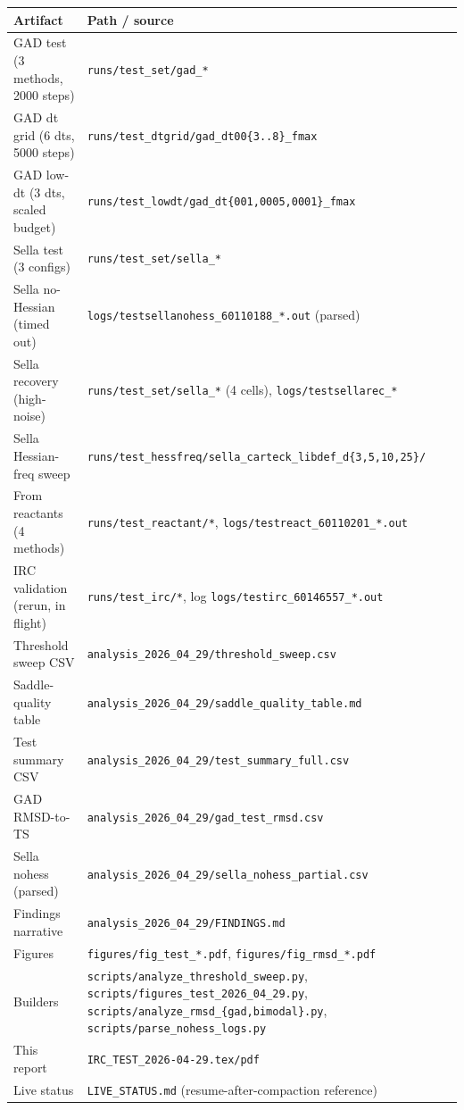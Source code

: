 \documentclass[11pt]{article}
\begin{document}
\begin{center}\small
\begin{tabular}{ll}
\toprule
Artifact & Path / source \\
\midrule
GAD test (3 methods, 2000 steps)  & \texttt{runs/test\_set/gad\_*} \\
GAD dt grid (6 dts, 5000 steps)   & \texttt{runs/test\_dtgrid/gad\_dt00\{3..8\}\_fmax} \\
GAD low-dt (3 dts, scaled budget) & \texttt{runs/test\_lowdt/gad\_dt\{001,0005,0001\}\_fmax} \\
Sella test (3 configs)            & \texttt{runs/test\_set/sella\_*} \\
Sella no-Hessian (timed out)      & \texttt{logs/testsellanohess\_60110188\_*.out} (parsed) \\
Sella recovery (high-noise)       & \texttt{runs/test\_set/sella\_*} (4 cells), \texttt{logs/testsellarec\_*} \\
Sella Hessian-freq sweep          & \texttt{runs/test\_hessfreq/sella\_carteck\_libdef\_d\{3,5,10,25\}/} \\
From reactants (4 methods)        & \texttt{runs/test\_reactant/*}, \texttt{logs/testreact\_60110201\_*.out} \\
IRC validation (rerun, in flight) & \texttt{runs/test\_irc/*}, log \texttt{logs/testirc\_60146557\_*.out} \\
Threshold sweep CSV               & \texttt{analysis\_2026\_04\_29/threshold\_sweep.csv} \\
Saddle-quality table              & \texttt{analysis\_2026\_04\_29/saddle\_quality\_table.md} \\
Test summary CSV                  & \texttt{analysis\_2026\_04\_29/test\_summary\_full.csv} \\
GAD RMSD-to-TS                    & \texttt{analysis\_2026\_04\_29/gad\_test\_rmsd.csv} \\
Sella nohess (parsed)             & \texttt{analysis\_2026\_04\_29/sella\_nohess\_partial.csv} \\
Findings narrative                & \texttt{analysis\_2026\_04\_29/FINDINGS.md} \\
Figures                           & \texttt{figures/fig\_test\_*.pdf}, \texttt{figures/fig\_rmsd\_*.pdf} \\
Builders                          & \texttt{scripts/analyze\_threshold\_sweep.py}, \texttt{scripts/figures\_test\_2026\_04\_29.py}, \texttt{scripts/analyze\_rmsd\_\{gad,bimodal\}.py}, \texttt{scripts/parse\_nohess\_logs.py} \\
This report                       & \texttt{IRC\_TEST\_2026-04-29.tex/pdf} \\
Live status                       & \texttt{LIVE\_STATUS.md} (resume-after-compaction reference) \\
\bottomrule
\end{tabular}
\end{center}
\end{document}

